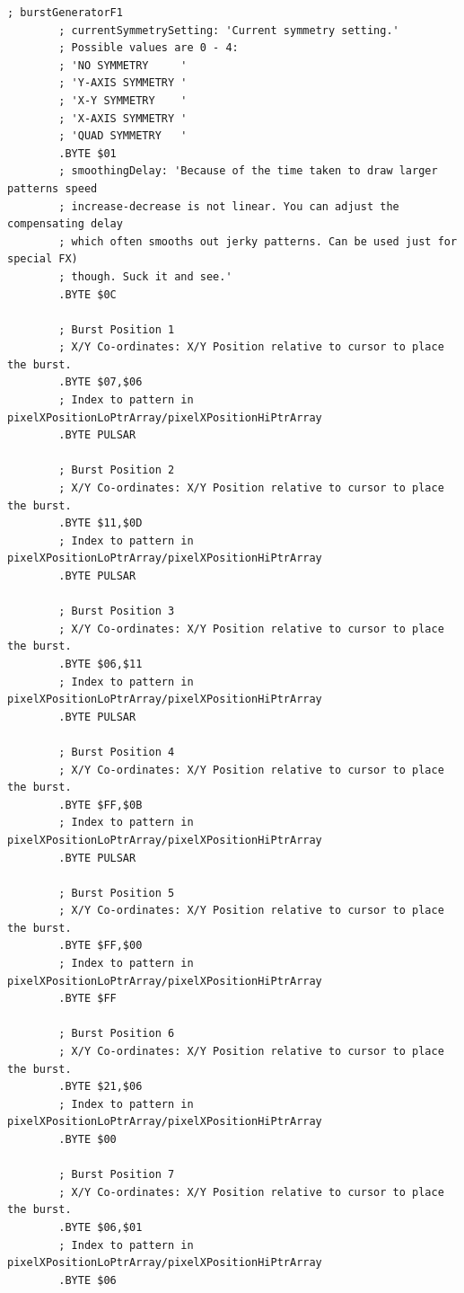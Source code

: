 \begin{lstlisting}[basicstyle=\tiny,caption=Source code for the F1 Burst.]
; burstGeneratorF1
        ; currentSymmetrySetting: 'Current symmetry setting.'
        ; Possible values are 0 - 4:
        ; 'NO SYMMETRY     '
        ; 'Y-AXIS SYMMETRY '
        ; 'X-Y SYMMETRY    '
        ; 'X-AXIS SYMMETRY '
        ; 'QUAD SYMMETRY   '
        .BYTE $01
        ; smoothingDelay: 'Because of the time taken to draw larger patterns speed
        ; increase-decrease is not linear. You can adjust the compensating delay
        ; which often smooths out jerky patterns. Can be used just for special FX)
        ; though. Suck it and see.'
        .BYTE $0C

        ; Burst Position 1
        ; X/Y Co-ordinates: X/Y Position relative to cursor to place the burst.
        .BYTE $07,$06
        ; Index to pattern in pixelXPositionLoPtrArray/pixelXPositionHiPtrArray
        .BYTE PULSAR

        ; Burst Position 2
        ; X/Y Co-ordinates: X/Y Position relative to cursor to place the burst.
        .BYTE $11,$0D
        ; Index to pattern in pixelXPositionLoPtrArray/pixelXPositionHiPtrArray
        .BYTE PULSAR

        ; Burst Position 3
        ; X/Y Co-ordinates: X/Y Position relative to cursor to place the burst.
        .BYTE $06,$11
        ; Index to pattern in pixelXPositionLoPtrArray/pixelXPositionHiPtrArray
        .BYTE PULSAR

        ; Burst Position 4
        ; X/Y Co-ordinates: X/Y Position relative to cursor to place the burst.
        .BYTE $FF,$0B
        ; Index to pattern in pixelXPositionLoPtrArray/pixelXPositionHiPtrArray
        .BYTE PULSAR

        ; Burst Position 5
        ; X/Y Co-ordinates: X/Y Position relative to cursor to place the burst.
        .BYTE $FF,$00
        ; Index to pattern in pixelXPositionLoPtrArray/pixelXPositionHiPtrArray
        .BYTE $FF

        ; Burst Position 6
        ; X/Y Co-ordinates: X/Y Position relative to cursor to place the burst.
        .BYTE $21,$06
        ; Index to pattern in pixelXPositionLoPtrArray/pixelXPositionHiPtrArray
        .BYTE $00

        ; Burst Position 7
        ; X/Y Co-ordinates: X/Y Position relative to cursor to place the burst.
        .BYTE $06,$01
        ; Index to pattern in pixelXPositionLoPtrArray/pixelXPositionHiPtrArray
        .BYTE $06


\end{lstlisting}
